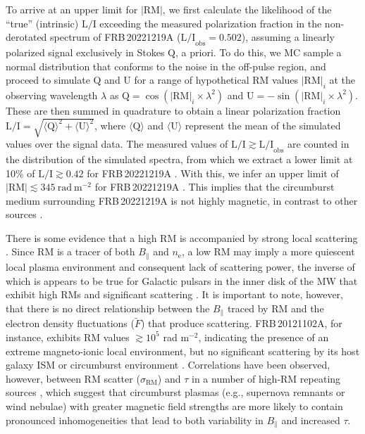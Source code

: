 \documentclass[twocolumn, linenumbers, tra]{aastex631}
\newcommand{\nihari}{FRB\,20221219A } %
\begin{document}
To arrive at an upper limit for $|\mathrm{RM}|$, we first calculate the likelihood of the ``true'' (intrinsic) $\mathrm{L/I}$ exceeding the measured polarization fraction in the non-derotated spectrum of \nihari ($\mathrm{L/I}_{\mathrm{obs}} = 0.502$), assuming a linearly polarized signal exclusively in Stokes $\mathrm{Q}$, a priori. To do this, we MC sample a normal distribution that conforms to the noise in the off-pulse region, and proceed to simulate $\mathrm{Q}$ and $\mathrm{U}$ for a range of hypothetical RM values $|\mathrm{RM}|_{i}$ at the observing wavelength $\lambda$ as $\mathrm{Q} = \cos \left(|\mathrm{RM}|_i \times \lambda^2\right)$ and $\mathrm{U} = -\sin \left(|\mathrm{RM}|_i \times \lambda^2\right)$. These are then summed in quadrature to obtain a linear polarization fraction $\mathrm{L/I} = \sqrt{\langle \mathrm{Q} \rangle^{2} + \langle \mathrm{U} \rangle^{2}}$, where $\langle \mathrm{Q} \rangle$ and $\langle \mathrm{U} \rangle$ represent the mean of the simulated values over the signal data. The measured values of $\mathrm{L/I} \gtrsim \mathrm{L/I}_{\mathrm{obs}}$ are counted in the distribution of the simulated spectra, from which we extract a lower limit at 10\% of $\mathrm{L/I} \gtrsim 0.42$ for \nihari. With this, we infer an upper limit of $|\mathrm{RM}| \lesssim 345\ \mathrm{rad}\ \mathrm{m}^{-2}$ for \nihari. This implies that the circumburst medium surrounding \nihari is not highly magnetic, in contrast to other sources \citep[e.g., $> 10^4\ \mathrm{rad\ m}^{-2}$ for FRB\,20190520B and FRB\,20121102A;][]{AnnaThomas2023, Michilli2018}.

There is some evidence that a high RM is accompanied by strong local scattering \citep[such as in FRB\,20190520B;][]{Ocker2022c, AnnaThomas2023}. Since RM is a tracer of both $B_{\|}$ and $n_{\mathrm{e}}$, {a low RM may imply a more quiescent} local plasma environment and consequent lack of scattering power, {the inverse of which is appears to be true for Galactic pulsars in the inner disk of the MW that exhibit high RMs and significant scattering} \citep{Lazio1998, Wharton2012, Eatough2013, Cordes2022}. {It is important to note}, however, that there is {no direct relationship} between the $B_{\|}$ traced by RM and the electron density fluctuations ($\widetilde{F}$) that produce scattering. FRB\,20121102A, for instance, exhibits RM values $\gtrsim 10^{5}$ rad m$^{-2}$, indicating the presence of an extreme magneto-ionic local environment, but no significant scattering by its host galaxy ISM or circumburst environment \citep{Michilli2018}. {Correlations have been observed, however, between RM scatter ($\sigma_{\mathrm{RM}}$) and $\tau$ in a number of high-$\mathrm{RM}$ repeating sources \citep{Feng2022}, which suggest that circumburst plasmas (e.g., supernova remnants or wind nebulae) with greater magnetic field strengths are more likely to contain pronounced inhomogeneities that lead to both variability in $B_{\|}$ and increased $\tau$.}
\end{document}
